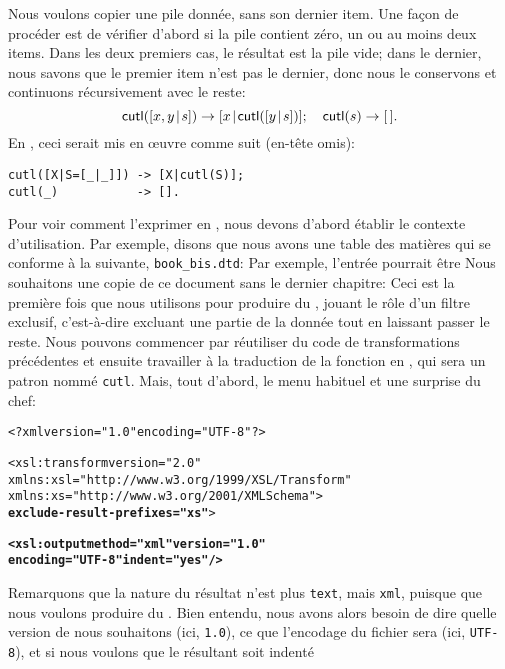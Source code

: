 
Nous voulons copier une pile donnée, sans son dernier item. Une façon
de procéder est de vérifier d'abord si la pile contient zéro, un ou au
moins deux items. Dans les deux premiers cas, le résultat est la pile
vide; dans le dernier, nous savons que le premier item n'est pas le
dernier, donc nous le conservons et continuons récursivement avec le
reste:
\begin{equation*}
\textsf{cutl}([{x,y}\!\mid\!{s}]) \rightarrow [{x}\!\mid\!{\textsf{cutl}([{y}\!\mid\!{s}])}];\quad
\textsf{cutl}(s) \rightarrow [\,].
\end{equation*}
En \Erlang, ceci serait mis en œuvre comme suit (en-tête omis):
\begin{verbatim}
cutl([X|S=[_|_]]) -> [X|cutl(S)];
cutl(_)           -> [].
\end{verbatim}
Pour voir comment l'exprimer en \XSLT, nous devons d'abord établir le
contexte d'utilisation. Par exemple, disons que nous avons une table
des matières qui se conforme à la \DTD suivante, \texttt{book\_bis.dtd}:
\noindent Par exemple, l'entrée pourrait être
\noindent Nous souhaitons une copie de ce document \XML sans le
dernier chapitre:
\noindent Ceci est la première fois que nous utilisons \XSLT pour
produire du \XML, jouant le rôle d'un filtre exclusif, c'est-à-dire
excluant une partie de la donnée tout en laissant passer le
reste. Nous pouvons commencer par réutiliser du code de
transformations précédentes et ensuite travailler à la traduction de
la fonction  en \XSLT, qui sera un patron nommé
\texttt{cutl}. Mais, tout d'abord, le menu habituel et une surprise du chef:
\begin{alltt}
\small<?xml version="1.0" encoding="UTF-8"?>

<xsl:transform version="2.0"
               xmlns:xsl="http://www.w3.org/1999/XSL/Transform"
               xmlns:xs="http://www.w3.org/2001/XMLSchema">
               \textbf{exclude-result-prefixes="xs"}>

  \textbf{<xsl:output method="xml" version="1.0"
              encoding="UTF-8" indent="yes"/>}
\end{alltt}
Remarquons que la nature du résultat n'est plus \texttt{text}, mais
\texttt{xml}, puisque que nous voulons produire du \XML. Bien entendu,
nous avons alors besoin de dire quelle version de \XML nous souhaitons
(ici, \texttt{1.0}), ce que l'encodage du fichier sera (ici,
\texttt{UTF-8}), et si nous voulons que le \XML résultant soit indenté

